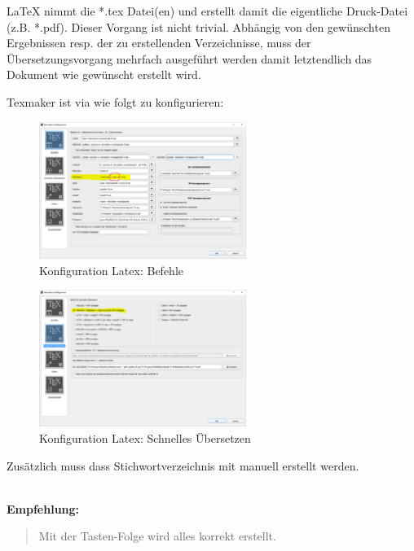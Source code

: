 LaTeX nimmt die *.tex Datei(en) und erstellt damit die eigentliche Druck-Datei (z.B. *.pdf). Dieser Vorgang ist nicht trivial. Abhängig von den gewünschten Ergebnissen resp. der zu erstellenden Verzeichnisse, muss der Übersetzungsvorgang mehrfach ausgeführt werden damit letztendlich das Dokument wie gewünscht erstellt wird.

Texmaker ist via  wie folgt zu konfigurieren:

\begin{figure}[h!]
\centering
  \includegraphics[width=0.6\textwidth]{./Bilder/Texmaker_Konfiguration_1.PNG}
  \caption{Konfiguration Latex: Befehle}
  \label{fig:Konfig}
\end{figure}

\begin{figure}[h!]
\centering
  \includegraphics[width=0.6\textwidth]{./Bilder/Texmaker_Konfiguration_2.PNG}
  \caption{Konfiguration Latex: Schnelles Übersetzen}
\end{figure}

Zusätzlich muss dass Stichwortverzeichnis mit  manuell erstellt werden.

\textbf{\\Empfehlung:} 
\begin{quote}
Mit der Tasten-Folge    wird alles korrekt erstellt.
\end{quote}
